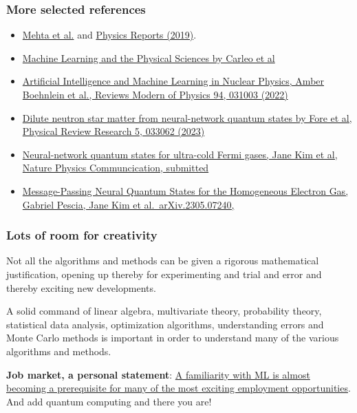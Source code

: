 \documentclass{beamer}
\begin{document}
\begin{frame}
\frametitle{More selected references}

\begin{block}{}
\begin{itemize}
\item \href{{https://arxiv.org/abs/1803.08823}}{Mehta et al.} and \href{{https://www.sciencedirect.com/science/article/pii/S0370157319300766?via%3Dihub}}{Physics Reports (2019)}.

\item \href{{https://link.aps.org/doi/10.1103/RevModPhys.91.045002}}{Machine Learning and the Physical Sciences by Carleo et al}

\item \href{{https://journals.aps.org/rmp/abstract/10.1103/RevModPhys.94.031003}}{Artificial Intelligence and Machine Learning in Nuclear Physics, Amber Boehnlein et al., Reviews Modern of Physics 94, 031003 (2022)} 

\item \href{{https://journals.aps.org/prresearch/pdf/10.1103/PhysRevResearch.5.033062}}{Dilute neutron star matter from neural-network quantum states by Fore et al, Physical Review Research 5, 033062 (2023)}

\item \href{{https://doi.org/10.48550/arXiv.2305.08831}}{Neural-network quantum states for ultra-cold Fermi gases, Jane Kim et al, Nature Physics Communcication, submitted}

\item \href{{https://doi.org/10.48550/arXiv.2305.07240}}{Message-Passing Neural Quantum States for the Homogeneous Electron Gas, Gabriel Pescia, Jane Kim et al.~arXiv.2305.07240,}
\end{itemize}

\noindent
\end{block}
\end{frame}

\begin{frame}
\frametitle{Lots of room for creativity}

\begin{block}{}
Not all the
algorithms and methods can be given a rigorous mathematical
justification, opening up thereby for experimenting
and trial and error and thereby exciting new developments. 
\end{block}

\begin{block}{}
A solid command of linear algebra, multivariate theory, 
probability theory, statistical data analysis, optimization algorithms, 
understanding errors and Monte Carlo methods is important in order to understand many of the 
various algorithms and methods. 
\end{block}

\textbf{Job market, a personal statement}: \href{{https://www.analyticsindiamag.com/top-countries-hiring-most-number-of-artificial-intelligence-machine-learning-experts/}}{A familiarity with ML is almost becoming a prerequisite for many of the most exciting employment opportunities}. And add quantum computing and there you are!
\end{frame}
\end{document}
